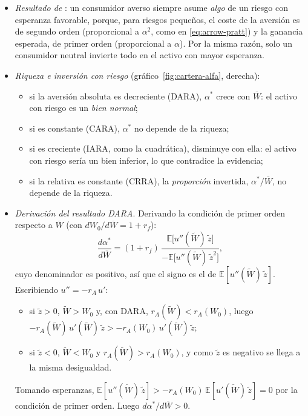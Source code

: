 \documentclass[11pt]{article}
\begin{document}
\begin{itemize}
\item \emph{Resultado de }: un consumidor averso siempre asume \emph{algo} de un riesgo con esperanza favorable, porque, para riesgos pequeños, el coste de la aversión es de segundo orden (proporcional a $\alpha^2$, como en \eqref{eq:arrow-pratt}) y la ganancia esperada, de primer orden (proporcional a $\alpha$). Por la misma razón, solo un consumidor neutral invierte todo en el activo con mayor esperanza.
\item \emph{Riqueza e inversión con riesgo} (gráfico~\ref{fig:cartera-alfa}, derecha):
  \begin{itemize}
  \item si la aversión absoluta es decreciente (DARA), $\alpha^*$ crece con $\overline{W}$: el activo con riesgo es un \emph{bien normal};
  \item si es constante (CARA), $\alpha^*$ no depende de la riqueza;
  \item si es creciente (IARA, como la cuadrática), disminuye con ella: el activo con riesgo sería un bien inferior, lo que contradice la evidencia;
  \item si la relativa es constante (CRRA), la \emph{proporción} invertida, $\alpha^*/\overline{W}$, no depende de la riqueza.
  \end{itemize}
\item \emph{Derivación del resultado DARA}. Derivando la condición de primer orden respecto a $\overline{W}$ (con $dW_0/d\overline{W}=1+r_f$):
  $$\frac{d\alpha^*}{d\overline{W}}=(1+r_f)\,\frac{\mathbb{E}\big[u''(\tilde{W})\,\tilde{z}\big]}{-\mathbb{E}\big[u''(\tilde{W})\,\tilde{z}^2\big]} ,$$
  cuyo denominador es positivo, así que el signo es el de $\mathbb{E}[u''(\tilde{W})\,\tilde{z}]$. Escribiendo $u''=-r_A\,u'$:
  \begin{itemize}
  \item si $\tilde{z}>0$, $\tilde{W}>W_0$ y, con DARA, $r_A(\tilde{W})<r_A(W_0)$, luego $-r_A(\tilde{W})\,u'(\tilde{W})\,\tilde{z}>-r_A(W_0)\,u'(\tilde{W})\,\tilde{z}$;
  \item si $\tilde{z}<0$, $\tilde{W}<W_0$ y $r_A(\tilde{W})>r_A(W_0)$, y como $\tilde{z}$ es negativo se llega a la misma desigualdad.
  \end{itemize}
  Tomando esperanzas, $\mathbb{E}[u''(\tilde{W})\,\tilde{z}]>-r_A(W_0)\,\mathbb{E}[u'(\tilde{W})\,\tilde{z}]=0$ por la condición de primer orden. Luego $d\alpha^*/d\overline{W}>0$. \findemo
\end{itemize}
\end{document}
